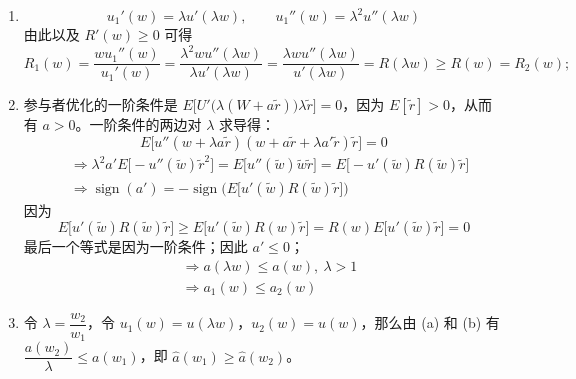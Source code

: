 \begin{solution}
\begin{enumerate}[label=(\alph*)]
    \item
    \[
        u_{1}'(w)=\lambda u'(\lambda w),\qquad u_{1}''(w)=\lambda^{2}u''(\lambda w)
    \]
    由此以及 $R'(w)\ge 0$ 可得
    \[
        R_{1}(w)=\frac{wu_{1}''(w)}{u_{1}'(w)}=\frac{\lambda^{2}wu''(\lambda w)}{\lambda u'(\lambda w)}=\frac{\lambda wu''(\lambda w)}{u'(\lambda w)}=R(\lambda w)\ge R(w)=R_{2}(w);
    \]

    \item 参与者优化的一阶条件是 $E\bigl[U'\bigl(\lambda(W+a\tilde{r})\bigr)\lambda\tilde{r}\bigr]=0$，因为 $E[\tilde{r}]>0$，从而有 $a>0$。一阶条件的两边对 $\lambda$ 求导得：
    \[
        E\bigl[u''(w+\lambda a\tilde{r})(w+a\tilde{r}+\lambda a'\tilde{r})\tilde{r}\bigr]=0
    \]
    \[
        \begin{aligned}
            &\Rightarrow\lambda^{2}a'E\bigl[-u''(\tilde{w})\tilde{r}^{2}\bigr]=E\bigl[u''(\tilde{w})\tilde{w}\tilde{r}\bigr]=E\bigl[-u'(\tilde{w})R(\tilde{w})\tilde{r}\bigr]\\
            &\Rightarrow\operatorname{sign}(a')=-\operatorname{sign}\bigl(E\bigl[u'(\tilde{w})R(\tilde{w})\tilde{r}\bigr]\bigr)
        \end{aligned}
    \]
    因为
    \[
        E\bigl[u'(\tilde{w})R(\tilde{w})\tilde{r}\bigr]\ge E\bigl[u'(\tilde{w})R(w)\tilde{r}\bigr]=R(w)E\bigl[u'(\tilde{w})\tilde{r}\bigr]=0
    \]
    最后一个等式是因为一阶条件；因此 $a'\le 0$；
    \[
        \begin{aligned}
            &\Rightarrow a(\lambda w)\le a(w),\ \lambda>1\\
            &\Rightarrow a_{1}(w)\le a_{2}(w)
        \end{aligned}
    \]

    \item 令 $\lambda=\dfrac{w_{2}}{w_{1}}$，令 $u_{1}(w)=u(\lambda w)$，$u_{2}(w)=u(w)$，那么由 (a) 和 (b) 有 $\dfrac{a(w_{2})}{\lambda}\le a(w_{1})$，即 $\widehat{a}(w_{1})\ge\widehat{a}(w_{2})$。
\end{enumerate}
\end{solution}

